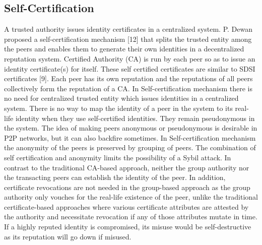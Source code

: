 \subsection{Self-Certification}
A trusted authority issues identity certificates in a
centralized system. P. Dewan proposed a self-certification
mechanism [12] that splits the trusted entity among the
peers and enables them to generate their own identities in a
decentralized reputation system. Certified Authority (CA)
is run by each peer so as to issue an identity certificate(s)
for itself. These self certified certificates are similar to
SDSI certificates [9]. Each peer has its own reputation and
the reputations of all peers collectively form the reputation
of a CA.
In Self-certification mechanism there is no need for
centralized trusted entity which issues identities in a
centralized system. There is no way to map the identity of
a peer in the system to its real-life identity when they use
self-certified identities. They remain pseudonymous in the
system. The idea of making peers anonymous or
pseudonymous is desirable in P2P networks, but it can also
backfire sometimes.
In Self-certification mechanism the anonymity of the peers
is preserved by grouping of peers. The combination of self
certification and anonymity limits the possibility of a Sybil
attack. In contrast to the traditional CA-based approach,
neither the group authority nor the transacting peers can
establish the identity of the peer. In addition, certificate
revocations are not needed in the group-based approach as
the group authority only vouches for the real-life existence
of the peer, unlike the traditional certificate-based
approaches where various certificate attributes are attested
by the authority and necessitate revocation if any of those
attributes mutate in time. If a highly reputed identity is
compromised, its misuse would be self-destructive as its
reputation will go down if misused.
